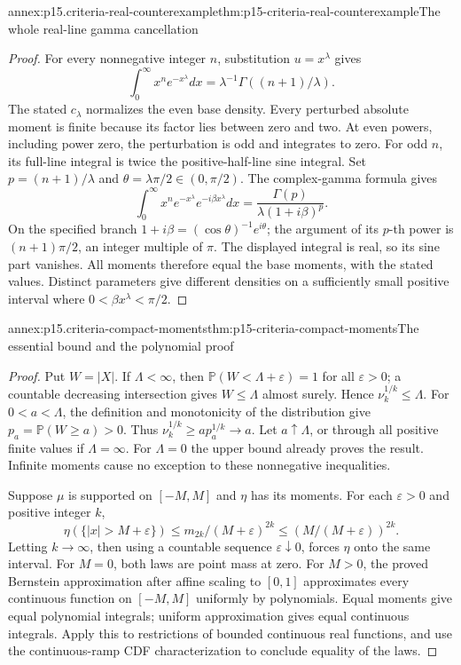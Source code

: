 \begin{annexitem}{annex:p15.criteria-real-counterexample}{thm:p15-criteria-real-counterexample}{The whole real-line gamma cancellation}
\begin{proof}
For every nonnegative integer \(n\), substitution
\(u=x^\lambda\) gives
\[
 \int_0^\infty x^n e^{-x^\lambda}dx
                  =\lambda^{-1}\Gamma((n+1)/\lambda).
\]
The stated \(c_\lambda\) normalizes the even base
density. Every perturbed absolute moment is finite
because its factor lies between zero and two.
At even powers, including power zero, the
perturbation is odd and integrates to zero.
For odd \(n\), its full-line integral is twice
the positive-half-line sine integral.
Set \(p=(n+1)/\lambda\) and
\(\theta=\lambda\pi/2\in(0,\pi/2)\).
The complex-gamma formula gives
\[
 \int_0^\infty x^n e^{-x^\lambda}e^{-i\beta x^\lambda}dx
                   =\frac{\Gamma(p)}{\lambda(1+i\beta)^p}.
\]
On the specified branch
\(1+i\beta=(\cos\theta)^{-1}e^{i\theta}\);
the argument of its \(p\)-th power is
\((n+1)\pi/2\), an integer multiple of \(\pi\).
The displayed integral is real, so its sine
part vanishes. All moments therefore equal the
base moments, with the stated values.
Distinct parameters give different densities
on a sufficiently small positive interval
where \(0<\beta x^\lambda<\pi/2\).
\end{proof}
\end{annexitem}

\begin{annexitem}{annex:p15.criteria-compact-moments}{thm:p15-criteria-compact-moments}{The essential bound and the polynomial proof}
\begin{proof}
Put \(W=|X|\). If \(\Lambda<\infty\), then
\(\mathbb P(W<\Lambda+\varepsilon)=1\) for all
\(\varepsilon>0\); a countable decreasing
intersection gives \(W\leq\Lambda\) almost surely.
Hence \(\nu_k^{1/k}\leq\Lambda\).
For \(0<a<\Lambda\), the definition and monotonicity
of the distribution give \(p_a=\mathbb P(W\geq a)>0\).
Thus \(\nu_k^{1/k}\geq a p_a^{1/k}\to a\).
Let \(a\uparrow\Lambda\), or through all positive
finite values if \(\Lambda=\infty\).
For \(\Lambda=0\) the upper bound already proves
the result. Infinite moments cause no exception
to these nonnegative inequalities.

Suppose \(\mu\) is supported on \([-M,M]\) and
\(\eta\) has its moments.
For each \(\varepsilon>0\) and positive integer \(k\),
\[
 \eta(\{|x|>M+\varepsilon\})
 \leq m_{2k}/(M+\varepsilon)^{2k}
 \leq(M/(M+\varepsilon))^{2k}.
\]
Letting \(k\to\infty\), then using a countable
sequence \(\varepsilon\downarrow0\), forces
\(\eta\) onto the same interval.
For \(M=0\), both laws are point mass at zero.
For \(M>0\), the proved Bernstein approximation
after affine scaling to \([0,1]\) approximates
every continuous function on \([-M,M]\)
uniformly by polynomials.
Equal moments give equal polynomial integrals;
uniform approximation gives equal continuous
integrals. Apply this to restrictions of
bounded continuous real functions, and use
the continuous-ramp CDF characterization
to conclude equality of the laws.
\end{proof}
\end{annexitem}

